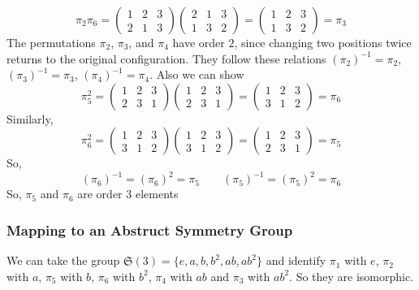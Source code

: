 \documentclass[a4paper,12pt]{article}
\theoremstyle{definition}
\begin{document}
\begin{equation*}
\pi_2 \pi_6 =
\begin{pmatrix}
1 & 2 & 3 \\
2 & 1 & 3
\end{pmatrix}
\begin{pmatrix}
2 & 1 & 3 \\
1 & 3 & 2
\end{pmatrix}
=
\begin{pmatrix}
1 & 2 & 3 \\
1 & 3 & 2
\end{pmatrix}
= \pi_3
\end{equation*}
The permutations $\pi_2$, $\pi_3$, and $\pi_4$ have order $2$, since changing two positions twice returns to the original configuration. They follow these relations $(\pi_2)^{-1}=\pi_2$, $(\pi_3)^{-1}=\pi_3$, $(\pi_4)^{-1}=\pi_4$. 
Also we can show
\begin{equation*}
\pi_5^2 =
\begin{pmatrix}
1 & 2 & 3 \\
2 & 3 & 1
\end{pmatrix}
\begin{pmatrix}
1 & 2 & 3 \\
2 & 3 & 1
\end{pmatrix}
=
\begin{pmatrix}
1 & 2 & 3 \\
3 & 1 & 2
\end{pmatrix}
= \pi_6
\end{equation*}
Similarly,
\begin{equation*}
\pi_6^2 =
\begin{pmatrix}
1 & 2 & 3 \\
3 & 1 & 2
\end{pmatrix}
\begin{pmatrix}
1 & 2 & 3 \\
3 & 1 & 2
\end{pmatrix}
=
\begin{pmatrix}
1 & 2 & 3 \\
2 & 3 & 1
\end{pmatrix}
= \pi_5
\end{equation*}
So, 
\begin{equation*}
    \boxed{(\pi_6)^{-1}=(\pi_6)^2=\pi_5 \qquad (\pi_5)^{-1}=(\pi_5)^2=\pi_6}
\end{equation*}
So, $\pi_5$ and  $\pi_6$ are order $3$ elements

\subsubsection*{Mapping to an Abstruct Symmetry Group}
We can take the group $\mathfrak{S}(3) = \{e, a, b, b^2, ab, ab^2\}$ and identify $\pi_1$ with $e$, $\pi_2$ with $a$, $\pi_5$ with $b$, $\pi_6$ with $b^2$, $\pi_4$ with $ab$ and $\pi_3$ with $ab^2$. So they are isomorphic.
\end{document}
